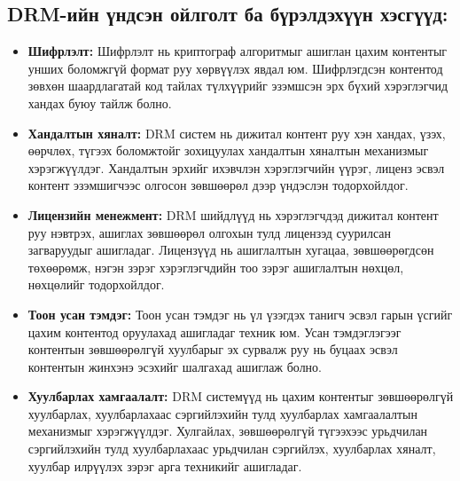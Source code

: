 \subsection{DRM-ийн үндсэн ойлголт ба бүрэлдэхүүн хэсгүүд:}
\begin{itemize}
   \item \textbf{Шифрлэлт:} Шифрлэлт нь криптограф алгоритмыг ашиглан цахим контентыг унших боломжгүй формат руу хөрвүүлэх явдал юм. Шифрлэгдсэн контентод зөвхөн шаардлагатай код тайлах түлхүүрийг эзэмшсэн эрх бүхий хэрэглэгчид хандах буюу тайлж болно.

    \item \textbf{Хандалтын хяналт:} DRM систем нь дижитал контент руу хэн хандах, үзэх, өөрчлөх, түгээх боломжтойг зохицуулах хандалтын хяналтын механизмыг хэрэгжүүлдэг. Хандалтын эрхийг ихэвчлэн хэрэглэгчийн үүрэг, лиценз эсвэл контент эзэмшигчээс олгосон зөвшөөрөл дээр үндэслэн тодорхойлдог.

    \item \textbf{Лицензийн менежмент:} DRM шийдлүүд нь хэрэглэгчдэд дижитал контент руу нэвтрэх, ашиглах зөвшөөрөл олгохын тулд лицензэд суурилсан загваруудыг ашигладаг. Лицензүүд нь ашиглалтын хугацаа, зөвшөөрөгдсөн төхөөрөмж, нэгэн зэрэг хэрэглэгчдийн тоо зэрэг ашиглалтын нөхцөл, нөхцөлийг тодорхойлдог.

    \item \textbf{Тоон усан тэмдэг:} Тоон усан тэмдэг нь үл үзэгдэх танигч эсвэл гарын үсгийг цахим контентод  оруулахад ашигладаг техник юм. Усан тэмдэглэгээг контентын зөвшөөрөлгүй хуулбарыг эх сурвалж руу нь буцаах эсвэл контентын жинхэнэ эсэхийг шалгахад ашиглаж болно.

    \item \textbf{Хуулбарлах хамгаалалт:} DRM системүүд нь цахим контентыг зөвшөөрөлгүй хуулбарлах, хуулбарлахаас сэргийлэхийн тулд хуулбарлах хамгаалалтын механизмыг хэрэгжүүлдэг. Хулгайлах, зөвшөөрөлгүй түгээхээс урьдчилан сэргийлэхийн тулд хуулбарлахаас урьдчилан сэргийлэх, хуулбарлах хяналт, хуулбар илрүүлэх зэрэг арга техникийг ашигладаг.
\end{itemize}

